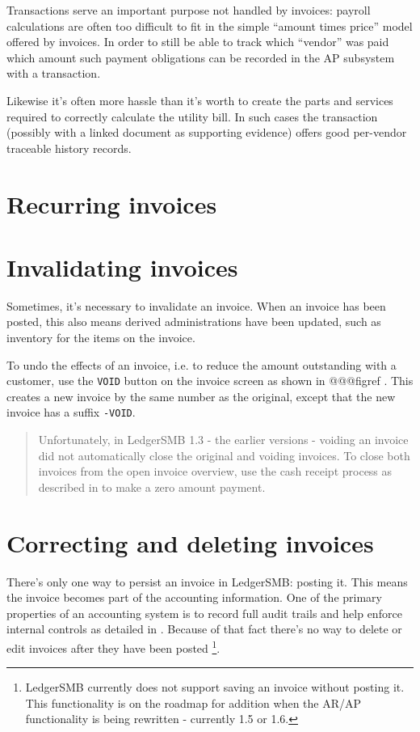 Transactions serve an important purpose not handled by invoices: payroll
calculations are often too difficult to fit in the simple ``amount times price''
model offered by invoices. In order to still be able to track which ``vendor''
was paid which amount such payment obligations can be recorded in the AP subsystem
with a transaction.

Likewise it's often more hassle than it's worth to create the parts and services
required to correctly calculate the utility bill. In such cases the transaction
(possibly with a linked document as supporting evidence) offers good per-vendor
traceable history records.


\section{Recurring invoices}



\section{Invalidating invoices}

Sometimes, it's necessary to invalidate an invoice. When an invoice has been
posted, this also means derived administrations have been updated, such as
inventory for the items on the invoice.

To undo the effects of an invoice, i.e. to reduce the amount outstanding with a
customer, use the \texttt{VOID} button on the invoice screen as shown in @@@figref .
This creates a new invoice by the same number as the original, except that the new
invoice has a suffix \texttt{-VOID}.

\begin{quotation}
Unfortunately, in LedgerSMB 1.3 - the earlier versions - voiding an invoice did not
automatically close the original and voiding invoices.  To close both invoices from
the open invoice overview, use the cash receipt process as described in
 to make a zero amount payment.
\end{quotation}

\section{Correcting and deleting invoices}
\label{sec:CorrectingInvoices}

There's only one way to persist an invoice in LedgerSMB: posting it. This means
the invoice becomes part of the accounting information. One of the primary
properties of an accounting system is to record full audit trails and help enforce
internal controls as detailed in . Because
of that fact there's no way to delete or edit invoices after they have been posted
\footnote{LedgerSMB currently does not support saving an invoice without posting
it. This functionality is on the roadmap for addition when the AR/AP functionality
is being rewritten - currently 1.5 or 1.6.}.

